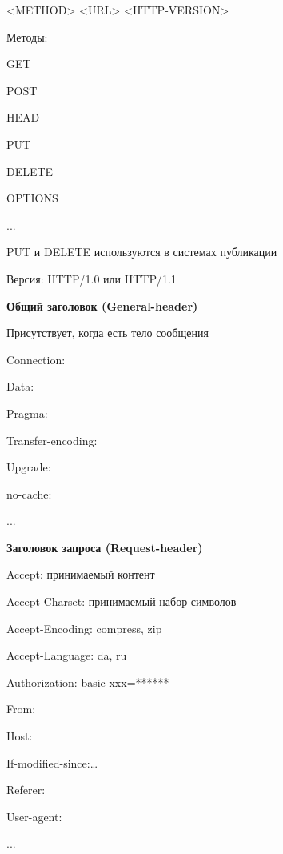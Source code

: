 
<METHOD> <URL> <HTTP-VERSION> 

Методы:
\begin{MyItemize}
    \item GET
    \item POST
    \item HEAD
    \item PUT
    \item DELETE
    \item OPTIONS
    \item ...
\end{MyItemize}

PUT и DELETE используются в системах публикации

Версия: HTTP/1.0 или HTTP/1.1



{\bf Общий заголовок (General-header)}

Присутствует, когда есть тело сообщения

\begin{MyItemize}
    \item Connection:
    \item Data:
    \item Pragma:
    \item Transfer-encoding:
    \item Upgrade:
    \item no-cache:
    \item ...
\end{MyItemize}

{\bf Заголовок запроса (Request-header)}

\begin{MyItemize}
    \item Accept: принимаемый контент
    \item Accept-Charset: принимаемый набор символов
    \item Accept-Encoding: compress, zip
    \item Accept-Language: da, ru
    \item Authorization: basic xxx=******
    \item From:
    \item Host:
    \item If-modified-since:…
    \item Referer:
    \item User-agent:
    \item ...
\end{MyItemize}

